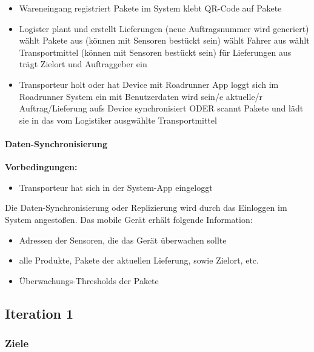 \begin{itemize}
  \item Wareneingang
  	\subitem registriert Pakete im System
  	\subitem klebt QR-Code auf Pakete

	\item Logister plant und erstellt Lieferungen (neue Auftragsnummer wird
	generiert) \subitem wählt Pakete aus (können mit Sensoren bestückt sein)
		\subitem wählt Fahrer aus 
		\subitem wählt Transportmittel (können mit Sensoren bestückt sein) für
		Lieferungen aus
		\subitem trägt Zielort und Auftraggeber ein
  	
  \item Transporteur
  	\subitem holt oder hat Device mit Roadrunner App
  	\subitem loggt sich im Roadrunner System ein
  		\subsubitem mit Benutzerdaten wird sein/e aktuelle/r Auftrag/Lieferung aufs
  		Device synchronisiert ODER 
  		\subsubitem scannt Pakete und lädt sie in das vom Logistiker ausgwählte
  		Transportmittel
\end{itemize}

\paragraph{Daten-Synchronisierung}
	\textbf{Vorbedingungen: }
	\begin{itemize}
	  \item Transporteur hat sich in der System-App eingeloggt
	\end{itemize}
	
	Die Daten-Synchronisierung oder Replizierung wird durch das Einloggen im
	System angestoßen. Das mobile Gerät erhält folgende Information:
	\begin{itemize}
	  \item Adressen der Sensoren, die das Gerät überwachen sollte
	  \item alle Produkte, Pakete der aktuellen Lieferung, sowie Zielort, etc.
	  \item Überwachungs-Thresholds der Pakete
	\end{itemize}
\par

\subsection{Iteration 1}

\subsubsection{Ziele}

